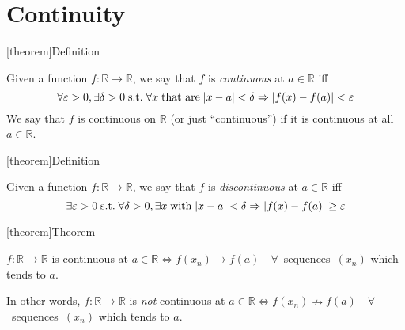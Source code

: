 \documentclass[12pt]{report}
\theoremstyle{definition}
\begin{document}
\section{Continuity}
[theorem]{Definition}
\begin{continuous function}
    Given a function $f:\mathbb{R} \rightarrow \mathbb{R}$, we say that $f$ is \emph{continuous} at $a \in \mathbb{R}$ 
    iff \[
        \forall \varepsilon > 0, \exists \delta > 0 \;\textnormal{s.t.}\;
        \forall x \;\textnormal{that are}\; |x-a|<\delta \Rightarrow
        |f(x) - f(a)| < \varepsilon
    \]
    We say that $f$ is continuous on $\mathbb{R}$ (or just ``continuous'') if it is continuous at all $a \in \mathbb{R}$.
\end{continuous function}

[theorem]{Definition}
\begin{discontinuous function}
    Given a function $f:\mathbb{R} \rightarrow \mathbb{R}$, we say that $f$ is \emph{discontinuous} at $a \in \mathbb{R}$ 
    iff \[
        \exists \varepsilon > 0 \;\textnormal{s.t.}\; \forall \delta > 0, \exists x \;\textnormal{with}\;  |x-a|<\delta \Rightarrow
        |f(x) - f(a)| \ge \varepsilon
    \]
    
\end{discontinuous function}


[theorem]{Theorem}
\begin{continuity with convergent sequence}
        $f:\mathbb{R} \rightarrow \mathbb{R}$ is continuous at $a \in \mathbb{R} 
        \iff f(x_n) \rightarrow f(a) \quad $\mbox{$\forall$ sequences $(x_n)$} which tends to $a$.

        In other words, 
        $f:\mathbb{R} \rightarrow \mathbb{R}$ is \emph{not} continuous at $a \in \mathbb{R} 
        \iff f(x_n) \nrightarrow f(a) \quad $\mbox{$\forall$ sequences $(x_n)$} which tends to $a$.
\end{continuity with convergent sequence}
\end{document}

